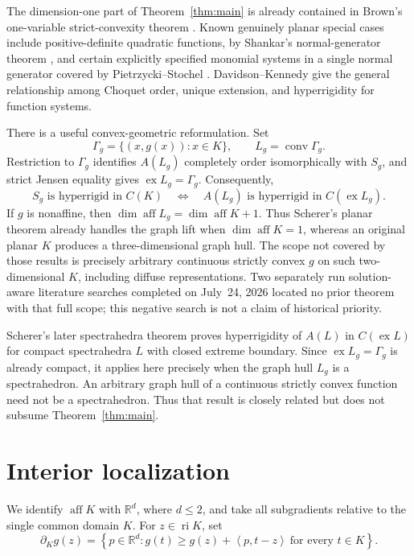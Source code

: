 \documentclass[11pt,a4paper]{amsart}
\theoremstyle{remark}
\newcommand{\aff}{\operatorname{aff}}
\newcommand{\ri}{\operatorname{ri}}
\newcommand{\ex}{\operatorname{ex}}
\newcommand{\inner}[2]{\left\langle #1,#2\right\rangle}
\begin{document}
The dimension-one part of Theorem~\ref{thm:main} is already contained in
Brown's one-variable strict-convexity theorem \cite{BrownConvergence}.
Known genuinely planar special cases include positive-definite quadratic
functions, by Shankar's normal-generator theorem \cite{Shankar}, and certain
explicitly specified monomial systems in a single normal generator covered
by Pietrzycki--Stochel \cite{PietrzyckiStochel}.  Davidson--Kennedy
\cite{DavidsonKennedy} give the general relationship among Choquet order,
unique extension, and hyperrigidity for function systems.

There is a useful convex-geometric reformulation.  Set
\[
 \Gamma_g=\{(x,g(x)):x\in K\},\qquad
 L_g=\operatorname{conv}\Gamma_g.
\]
Restriction to \(\Gamma_g\) identifies \(A(L_g)\) completely order
isomorphically with \(S_g\), and strict Jensen equality gives
\(\ex L_g=\Gamma_g\).  Consequently,
\[
 S_g\text{ is hyperrigid in }C(K)
 \quad\Longleftrightarrow\quad
 A(L_g)\text{ is hyperrigid in }C(\ex L_g).
\]
If \(g\) is nonaffine, then
\(\dim\aff L_g=\dim\aff K+1\).  Thus Scherer's planar theorem already handles
the graph lift when \(\dim\aff K=1\), whereas an original planar \(K\)
produces a three-dimensional graph hull.  The scope not covered by those
results is precisely arbitrary continuous strictly convex \(g\) on such
two-dimensional \(K\), including diffuse representations.  Two separately
run solution-aware literature searches completed on July~24, 2026 located no
prior theorem with that full scope; this negative search is not a claim of
historical priority.

Scherer's later spectrahedra theorem \cite{SchererSpectrahedra} proves
hyperrigidity of \(A(L)\) in \(C(\ex L)\) for compact spectrahedra \(L\)
with closed extreme boundary.  Since \(\ex L_g=\Gamma_g\) is already compact,
it applies here precisely when the graph hull \(L_g\) is a spectrahedron.
An arbitrary graph hull of a continuous strictly convex function need not be
a spectrahedron.  Thus that result is closely related but does not subsume
Theorem~\ref{thm:main}.

\section{Interior localization}

We identify \(\aff K\) with \(\mathbb R^d\), where \(d\leq2\), and take all
subgradients relative to the single common domain \(K\).  For
\(z\in\ri K\), set
\[
 \partial_Kg(z)=
 \left\{p\in\mathbb R^d:
 g(t)\geq g(z)+\inner{p}{t-z}\ \text{for every }t\in K\right\}.
\]
\end{document}

